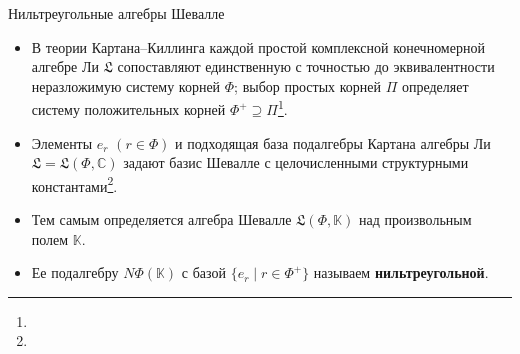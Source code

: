 \documentclass[12pt,aspectratio=169]{beamer}
\newcommand{\K}{\mathbb{K}}
\newcommand{\term}[1]{{\color{MainRed}\bfseries #1}}
\newcommand{\sourcefootnote}[1]{\footnote{\slidecite{#1}}}
\begin{document}
\begin{frame}[t]{Нильтреугольные алгебры Шевалле}
    \small
    \begin{itemize}
        \item В теории Картана--Киллинга каждой простой комплексной конечномерной алгебре Ли
              $\mathfrak{L}$ сопоставляют единственную с точностью до эквивалентности неразложимую
              систему корней $\Phi$; выбор простых корней $\Pi$ определяет систему
              положительных корней $\Phi^+\supseteq \Pi$\sourcefootnote{carter72}.
        \item Элементы $e_r$ $(r \in \Phi)$ и подходящая база подалгебры Картана алгебры Ли
              $\mathfrak{L}=\mathfrak{L}(\Phi,\mathbb{C})$ задают базис Шевалле с целочисленными
              структурными константами\sourcefootnote{Chev-55}.
        \item Тем самым определяется алгебра Шевалле $\mathfrak{L}(\Phi,\K)$ над произвольным
              полем $\K$.
        \item Ее подалгебру $N\Phi(\K)$ с базой $\{e_r\mid r\in\Phi^+\}$ называем
              \term{нильтреугольной}.
    \end{itemize}
\end{frame}

\end{document}
